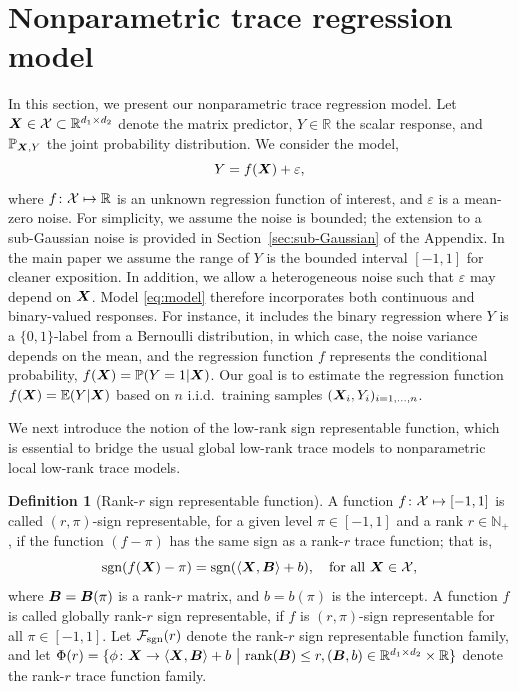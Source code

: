 \documentclass[aos]{imsart}
\theoremstyle{definition}
\newtheorem{definition}{Definition}
\def\sign{\textup{sgn}}
\def\caliF{\tF_{\textup{sgn}}}
\begin{document}
\section{Nonparametric trace regression model}
\label{sec:idea}

In this section, we present our nonparametric trace regression model. Let $\bm X\in\mathcal{X}\subset \mathbb{R}^{d_1\times d_2}$ denote the matrix predictor, $Y\in\mathbb{R}$ the scalar response, and $\mathbb{P}_{\bm X,Y}$ the joint probability distribution. We consider the model,
\begin{equation}\label{eq:model}
Y=f(\mX)+\varepsilon,
\end{equation}
where $f\colon\mathcal{X}\mapsto \mathbb{R}$ is an unknown regression function of interest, and $\varepsilon$ is a mean-zero noise. For simplicity, we assume the noise is bounded; the extension to a sub-Gaussian noise is provided in Section~\ref{sec:sub-Gaussian} of the Appendix. In the main paper we assume the range of $Y$ is the bounded interval $[-1,1]$ for cleaner exposition. In addition, we allow a heterogeneous noise such that $\varepsilon$ may depend on $\bm X$. Model \eqref{eq:model} therefore incorporates both continuous and binary-valued responses. For instance, it includes the binary regression where $Y$ is a $\{0,1\}$-label from a Bernoulli distribution, in which case, the noise variance depends on the mean, and the regression function $f$ represents the conditional probability, $f(\bm X)=\mathbb{P}(Y=1|\bm X)$. Our goal is to estimate the regression function $f(\bm X)=\mathbb{E}(Y|\bm X)$ based on $n$ i.i.d.\ training samples $(\bm X_i,Y_i)_{i=1,\ldots,n}$. 

We next introduce the notion of the low-rank sign representable function, which is essential to bridge the usual global low-rank trace models to nonparametric local low-rank trace models. 

\begin{definition}[Rank-$r$ sign representable function] \label{def:caliF}
A function $f\colon \mathcal{X}\mapsto[-1,1]$ is called $(r,\pi)$-sign representable, for a given level $\pi\in[-1,1]$ and a rank $r \in \mathbb{N}_{+}$, if the function $(f-\pi)$ has the same sign as a rank-$r$ trace function; that is,
\begin{equation} \label{eq:sign}
\sign(f(\mX)-\pi) = \sign(\langle \mX, \mB \rangle+b),\quad \text{for all }\mX\in\tX,
\end{equation}
where $\bm B=\bm B(\pi)$ is a rank-$r$ matrix, and $b=b(\pi)$ is the intercept. A function $f$ is called globally rank-$r$ sign representable, if $f$ is $(r,\pi)$-sign representable for all $\pi\in[-1,1]$. Let $\caliF(r)$ denote the rank-$r$ sign representable function family, and let $\Phi(r)=\{\phi\colon \bm X\to \langle \bm X, \bm B \rangle+b\ \big|\ \text{rank}(\bm B)\leq r, (\bm B,b)\in\mathbb{R}^{d_1\times d_2}\times\mathbb{R}\}$ denote the rank-$r$ trace function family.
\end{definition}
\end{document}
